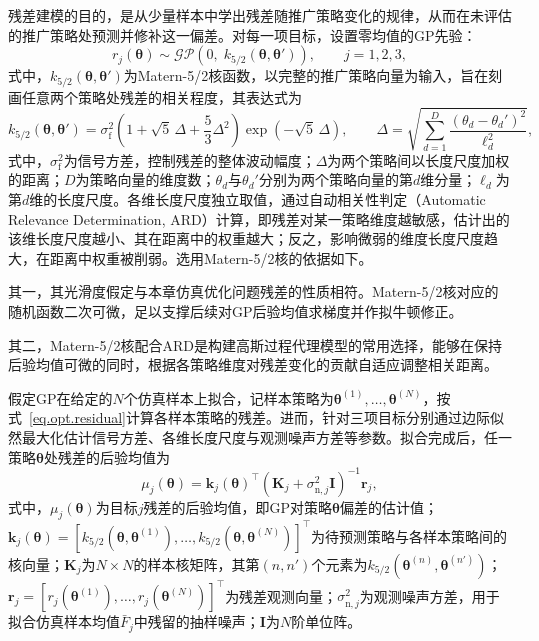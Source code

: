 残差建模的目的，是从少量样本中学出残差随推广策略变化的规律，从而在未评估的推广策略处预测并修补这一偏差。对每一项目标，设置零均值的GP先验：
\begin{equation}
r_{j}\left(\bm{\theta}\right)\sim\mathcal{GP}\left(0,\;k_{5/2}\left(\bm{\theta},\bm{\theta}'\right)\right),\qquad j=1,2,3,
\label{eq.opt.gp}
\end{equation}
式中，$k_{5/2}\left(\bm{\theta},\bm{\theta}'\right)$为Matern-5/2核函数，以完整的推广策略向量为输入，旨在刻画任意两个策略处残差的相关程度，其表达式为
\begin{equation}
k_{5/2}\left(\bm{\theta},\bm{\theta}'\right)=\sigma_{\mathrm{f}}^{2}\left(1+\sqrt{5}\,\Delta+\frac{5}{3}\Delta^{2}\right)\exp\left(-\sqrt{5}\,\Delta\right),\qquad
\Delta=\sqrt{\sum_{d=1}^{D}\frac{\left(\theta_{d}-\theta_{d}'\right)^{2}}{\ell_{d}^{2}}},
\label{eq.opt.matern}
\end{equation}
式中，$\sigma_{\mathrm{f}}^{2}$为信号方差，控制残差的整体波动幅度；$\Delta$为两个策略间以长度尺度加权的距离；$D$为策略向量的维度数；$\theta_{d}$与$\theta_{d}'$分别为两个策略向量的第$d$维分量；$\ell_{d}$为第$d$维的长度尺度。各维长度尺度独立取值，通过自动相关性判定（Automatic Relevance Determination, ARD）计算，即残差对某一策略维度越敏感，估计出的该维长度尺度越小、其在距离中的权重越大；反之，影响微弱的维度长度尺度趋大，在距离中权重被削弱。选用Matern-5/2核的依据如下。

其一，其光滑度假定与本章仿真优化问题残差的性质相符。Matern-5/2核对应的随机函数二次可微，足以支撑后续对GP后验均值求梯度并作拟牛顿修正。

其二，Matern-5/2核配合ARD是构建高斯过程代理模型的常用选择\citep{frazierTutorialBayesianOptimization2018,erikssonScalableGlobalOptimization2019}，能够在保持后验均值可微的同时，根据各策略维度对残差变化的贡献自适应调整相关距离。

假定GP在给定的$N$个仿真样本上拟合，记样本策略为$\bm{\theta}^{(1)},\dots,\bm{\theta}^{(N)}$，按式~\eqref{eq.opt.residual}计算各样本策略的残差。进而，针对三项目标分别通过边际似然最大化估计信号方差、各维长度尺度与观测噪声方差等参数。拟合完成后，任一策略$\bm{\theta}$处残差的后验均值为
\begin{equation}
\mu_{j}\left(\bm{\theta}\right)=\bm{k}_{j}\left(\bm{\theta}\right)^{\top}\left(\bm{K}_{j}+\sigma_{\mathrm{n},j}^{2}\bm{I}\right)^{-1}\bm{r}_{j},
\label{eq.opt.gppost}
\end{equation}
式中，$\mu_{j}\left(\bm{\theta}\right)$为目标$j$残差的后验均值，即GP对策略$\bm{\theta}$偏差的估计值；$\bm{k}_{j}\left(\bm{\theta}\right)=\left[k_{5/2}\left(\bm{\theta},\bm{\theta}^{(1)}\right),\dots,k_{5/2}\left(\bm{\theta},\bm{\theta}^{(N)}\right)\right]^{\top}$为待预测策略与各样本策略间的核向量；$\bm{K}_{j}$为$N\times N$的样本核矩阵，其第$\left(n,n'\right)$个元素为$k_{5/2}\left(\bm{\theta}^{(n)},\bm{\theta}^{(n')}\right)$；$\bm{r}_{j}=\left[r_{j}\left(\bm{\theta}^{(1)}\right),\dots,r_{j}\left(\bm{\theta}^{(N)}\right)\right]^{\top}$为残差观测向量；$\sigma_{\mathrm{n},j}^{2}$为观测噪声方差，用于拟合仿真样本均值$\bar{F}_{j}$中残留的抽样噪声；$\bm{I}$为$N$阶单位阵。

